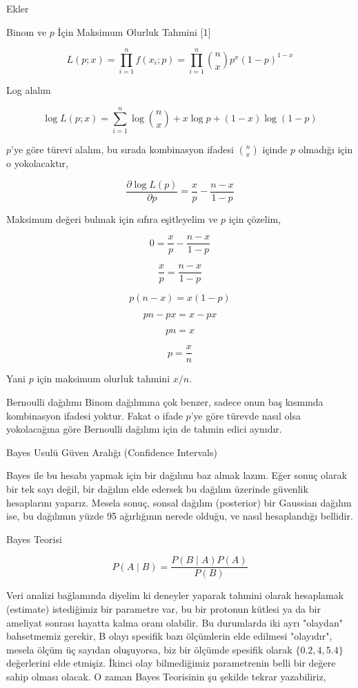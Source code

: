 \documentclass[12pt,fleqn]{article}\usepackage{../../common}
\begin{document}
Ekler

Binom ve $p$ İçin Maksimum Olurluk Tahmini [1]

$$ L(p;x) = \prod_{i=1}^n f(x_i;p) = \prod_{i=1}^n {n \choose x} p^x(1-p)^{1-x} $$

Log alalım

$$ \log L(p;x) = 
\sum_{i=1}^n \log {n \choose x} + x \log p + (1-x) \log (1-p) $$

$p$'ye göre türevi alalım, bu sırada kombinasyon ifadesi ${n \choose x}$
içinde $p$ olmadığı için o yokolacaktır,

$$ \frac{\partial \log L(p)}{\partial p} =
\frac{x}{p} - \frac{n-x}{1-p}
$$

Maksimum değeri bulmak için sıfıra eşitleyelim ve $p$ için çözelim,

$$ 0 = \frac{x}{p} - \frac{n-x}{1-p} $$

$$  \frac{x}{p} = \frac{n-x}{1-p}  $$

$$ p(n-x)  = x(1-p) $$

$$ pn - px = x-px $$

$$ pn = x $$

$$ p = \frac{x}{n} $$

Yani $p$ için maksimum olurluk tahmini $x/n$. 

Bernoulli dağılımı Binom dağılımına çok benzer, sadece onun baş kısmında
kombinasyon ifadesi yoktur. Fakat o ifade $p$'ye göre türevde nasıl olsa
yokolacağına göre Bernoulli dağılımı için de tahmin edici aynıdır.

\newpage

Bayes Usulü Güven Aralığı (Confidence Intervals) 

Bayes ile bu hesabı yapmak için bir dağılımı baz almak lazım. Eğer sonuç
olarak bir tek sayı değil, bir dağılım elde edersek bu dağılım üzerinde
güvenlik hesaplarını yaparız. Mesela sonuç, sonsal dağılım (posterior) bir
Gaussian dağılım ise, bu dağılımın yüzde 95 ağırlığının nerede olduğu, ve
nasıl hesaplandığı bellidir.

Bayes Teorisi

$$ P(A \mid B)  = \frac{P(B \mid A)P(A)}{P(B)} $$

Veri analizi bağlamında diyelim ki deneyler yaparak tahmini olarak
hesaplamak (estimate) istediğimiz bir parametre var, bu bir protonun
kütlesi ya da bir ameliyat sonrası hayatta kalma oranı olabilir. Bu
durumlarda iki ayrı "olaydan" bahsetmemiz gerekir, B olayı spesifik bazı
ölçümlerin elde edilmesi "olayıdır", mesela ölçüm üç sayıdan oluşuyorsa,
biz bir ölçümde spesifik olarak $\{0.2,4,5.4\}$ değerlerini elde
etmişiz. İkinci olay bilmediğimiz parametrenin belli bir değere sahip
olması olacak. O zaman Bayes Teorisinin şu şekilde tekrar yazabiliriz, 
\end{document}
